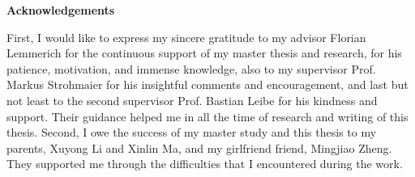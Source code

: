 \thispagestyle{plain}
\vspace*{\fill}
\begin{center}
	\Large
	\textbf{Acknowledgements}
\end{center}

\vspace{1cm}


First, I would like to express my sincere gratitude to my advisor Florian Lemmerich for the continuous support of my master thesis and research, for his patience, motivation, and immense knowledge, also to my supervisor Prof. Markus Strohmaier for his insightful comments and encouragement, and last but not least to the second supervisor Prof. Bastian Leibe for his kindness and support. Their guidance helped me in all the time of research and writing of this thesis.
Second, I owe the success of my master study and this thesis to my parents, Xuyong Li and Xinlin Ma, and my girlfriend friend, Mingjiao Zheng. They supported me through the difficulties that I encountered during the work.
\vspace*{\fill}